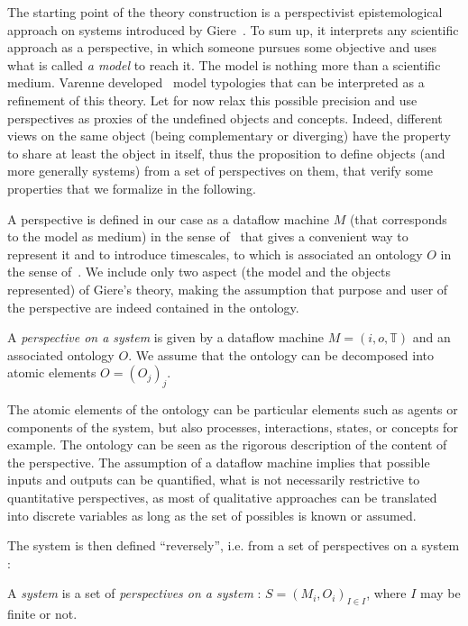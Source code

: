 The starting point of the theory construction is a perspectivist epistemological approach on systems introduced by Giere~\cite{giere2010scientific}.  To sum up, it interprets any scientific approach as a perspective, in which someone pursues some objective and uses what is called \emph{a model} to reach it. The model is nothing more than a scientific medium. Varenne developed~\cite{varenne2010framework} model typologies that can be interpreted as a refinement of this theory. Let for now relax this possible precision and use perspectives as proxies of the undefined objects and concepts. Indeed, different views on the same object (being complementary or diverging) have the property to share at least the object in itself, thus the proposition to define objects (and more generally systems) from a set of perspectives on them, that verify some properties that we formalize in the following.

A perspective is defined in our case as a dataflow machine $M$ (that corresponds to the model as medium) in the sense of~\cite{golden2012modeling} that gives a convenient way to represent it and to introduce timescales, to which is associated an ontology $O$ in the sense of~\cite{livet2010}. We include only two aspect (the model and the objects represented) of Giere's theory, making the assumption that purpose and user of the perspective are indeed contained in the ontology.

\begin{definition}
A \emph{perspective on a system} is given by a dataflow machine $M = (i,o,\mathbb{T})$ and an associated ontology $O$. We assume that the ontology can be decomposed into atomic elements $O=(O_j)_j$.
\end{definition}

The atomic elements of the ontology can be particular elements such as agents or components of the system, but also processes, interactions, states, or concepts for example. The ontology can be seen as the rigorous description of the content of the perspective. The assumption of a dataflow machine implies that possible inputs and outputs can be quantified, what is not necessarily restrictive to quantitative perspectives, as most of qualitative approaches can be translated into discrete variables as long as the set of possibles is known or assumed. 

The system is then defined ``reversely'', i.e. from a set of perspectives on a system :

\begin{definition}
A \emph{system} is a set of \emph{perspectives on a system} : $S = (M_i,O_i)_{I\in I}$, where $I$ may be finite or not.
\end{definition}

